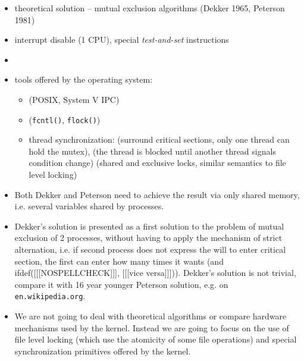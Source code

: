 \begin{slide}
\begin{itemize}
\item theoretical solution -- mutual exclusion algorithms (Dekker
1965, Peterson 1981)
\item interrupt disable (1 CPU), special \emph{test-and-set} instructions
\item {}
\item tools offered by the operating system:
    \begin{itemize}
    \item {} (POSIX, System V IPC)
    \item {} (\texttt{fcntl()}, \texttt{flock()})
    \item thread synchronization:  (surround critical sections,
    only one thread can hold the mutex), 
    (the thread is blocked until another thread signals condition change)
     (shared and exclusive locks, similar semantics
    to file level locking)
    \end{itemize}
\end{itemize}
\end{slide}

\begin{itemize}
\item Both Dekker and Peterson need to achieve the result via only shared
memory, i.e. several variables shared by processes.
\item Dekker's solution is presented as a first solution to the problem of
mutual exclusion of 2 processes, without having to apply the mechanism of
strict alternation, i.e. if second process does not express the will to enter
critical section, the first can enter how many times it wants
(and ifdef([[[NOSPELLCHECK]]], [[[vice versa]]])).
Dekker's solution is not trivial, compare it with 16 year younger
Peterson solution, e.g. on \texttt{en.wikipedia.org}.
\item We are not going to deal with theoretical algorithms or compare hardware
mechanisms used by the kernel. Instead we are going to focus on the use of
file level locking (which use the atomicity of some file operations)
and special synchronization primitives offered by the kernel.
\end{itemize}



